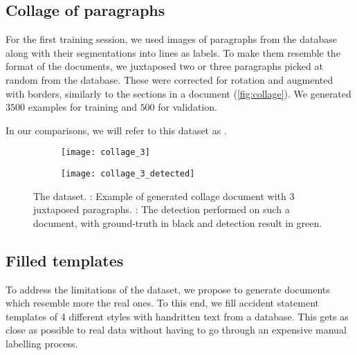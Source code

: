 
	\subsection{Collage of paragraphs}
		For the first training session, we used images of paragraphs from the database along with their segmentations into lines as labels. To make them resemble the format of the documents, we juxtaposed two or three paragraphs picked at random from the database. These were corrected for rotation and augmented with borders, similarly to the sections in a document (\autoref{fig:collage}). We generated \(3500\) examples for training and \(500\) for validation.

		In our comparisons, we will refer to this dataset as .


		\begin{figure}
			\centering
			\begin{subfigure}[c]{\textwidth}
				\texttt{[image: collage\_3]}
				\caption{}
				\label{sfig:collage_clean}
			\end{subfigure}
			\vspace{1em}

			\begin{subfigure}[c]{\textwidth}
				\texttt{[image: collage\_3\_detected]}
				\caption{}
				\label{sfig:collage_detect}
			\end{subfigure}
			\caption[ dataset]{
				The  dataset.
				: Example of generated collage document with 3 juxtaposed paragraphs.
				: The detection performed on such a document, with ground-truth in black and detection result in green.
			}
			\label{fig:collage}
		\end{figure}


	\subsection{Filled templates}
		To address the limitations of the  dataset, we propose to generate documents which resemble more the real ones. To this end, we fill accident statement templates of 4 different styles with handritten text from a database. This gets as close as possible to real data without having to go through an expensive manual labelling process.

